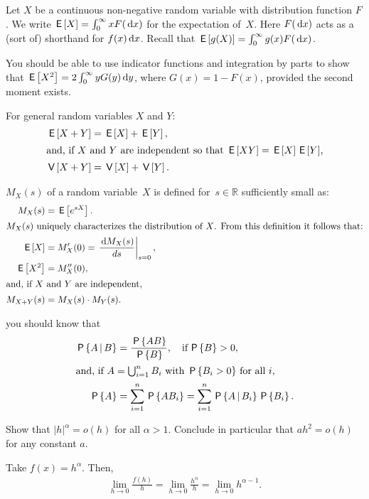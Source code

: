 \documentclass[queueing-book]{subfiles}
\begin{document}
Let $X$ be a continuous non-negative random variable with distribution function $F$.
We write $ \,\mathsf{E}\left[X\right] = \int_0^\infty x F(\,\textrm{d}x)$ for the expectation of~$X$.
Here $F(\,\textrm{d}x)$ acts as a (sort of) shorthand for $f(x) \,\textrm{d}x$.
Recall that $\,\mathsf{E}\left[g(X)\right] = \int_0^\infty g(x) F(\,\textrm{d}x)$.

You should be able to use indicator functions and integration by parts to show that $\,\mathsf{E}\left[X^2\right] = 2\int_0^\infty y G(y) \,\textrm{d}y$, where $G(x) = 1- F(x)$, provided the second moment exists.

For general random variables $X$ and $Y$:
\begin{align}
  \,\mathsf{E}\left[X+Y\right] &= \,\mathsf{E}\left[X\right] + \,\mathsf{E}\left[Y\right], \label{eq:95}\\
\intertext{and, if $X$ and $Y$ are independent so that $\,\mathsf{E}\left[XY\right] = \,\mathsf{E}\left[X\right] \,\mathsf{E}\left[Y\right]$,}
  \,\mathsf{V}\left[X+Y\right] &= \,\mathsf{V}\left[X\right] + \,\mathsf{V}\left[Y\right]. \label{eq:94}
\end{align}

 $M_X(s)$ of a random variable~$X$ is defined for~$s\in \mathbb{R}$ sufficiently small as:
\begin{subequations}
\begin{align}
 M_X(s) &= \,\mathsf{E}\left[e^{s X}\right]. \label{eq:75}\\
\intertext{$M_X(s)$  uniquely characterizes the distribution of $X$. From this definition it follows that:}
 \,\mathsf{E}\left[X\right] &= M_{X}'(0) = \left.\frac{\,\textrm{d}M_{X}(s)}{d s}\right|_{s=0},\label{eq:69}\\
\,\mathsf{E}\left[X^2\right] &= M_{X}''(0), \label{eq:64}\\
\intertext{and, if $X$ and $Y$ are independent,}
M_{X+Y}(s) &= M_X(s)\cdot M_Y(s). \label{eq:73}
\end{align}
\end{subequations}


 you should know that
\begin{subequations}\label{eq:70}
\begin{align}
\,\mathsf{P}\left\{A\,\middle|\, B\right\} & = \frac{\,\mathsf{P}\left\{AB\right\}}{\,\mathsf{P}\left\{B\right\}}, \quad\text{if}\, \,\mathsf{P}\left\{B\right\}>0, \\
\intertext{and, if $A=\bigcup_{i=1}^n B_i$ with $\,\mathsf{P}\left\{B_i>0\right\}$ for all $i$,}
 \,\mathsf{P}\left\{A\right\} &= \sum_{i=1}^n \,\mathsf{P}\left\{A B_i\right\} = \sum_{i=1}^n \,\mathsf{P}\left\{A\,\middle|\, B_i\right\} \,\mathsf{P}\left\{B_i\right\}.
\end{align}
\end{subequations}

\begin{exercise}\label{ex:12}
Show that $|h|^{\alpha} = o(h)$ for all $\alpha > 1$. Conclude in particular that $a h^{2} = o(h)$ for any constant $a$.
\begin{solution}
Take $f(x) = h^{\alpha}$. Then,
\begin{align*}
\lim_{h\to 0} \frac{f(h)}{h} =
\lim_{h\to 0} \frac{h^{\alpha}}{h} =
\lim_{h\to 0} h^{\alpha-1}.
\end{align*}
\end{solution}
\end{exercise}
\end{document}
